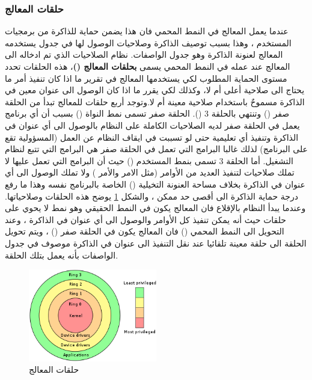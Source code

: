 \documentclass[document.tex]{subfiles}
\begin{document}
\subsubsection{حلقات المعالج }
عندما يعمل المعالج في النمط المحمي فان هذا يضمن حماية للذاكرة من برمجيات المستخدم ، وهذا بسبب توصيف الذاكرة وصلاحيات الوصول لها في جدول يستخدمه المعالج لعنونة الذاكرة وهو جدول الواصفات. نظام الصلاحيات الذي تم ادخاله الى المعالج عند عمله في النمط المحمي يسمى \textbf{بحلقات المعالج ()}، هذه الحلقات تحدد مستوى الحماية المطلوب لكي يستخدمها المعالج في تقرير ما اذا كان تنفيذ أمر ما يحتاج الى صلاحية أعلى أم لا، وكذلك لكي يقرر ما اذا كان الوصول الى عنوان معين في الذاكرة مسموحٌ باستخدام صلاحية معينة أم لا.وتوجد أربع حلقات للمعالج تبدأ من الحلقة صفر () وتنتهي بالحلقة 3 (). الحلقة صفر تسمى نمط النواة () بسبب أن أي برنامج يعمل في الحلقة صفر لديه الصلاحيات الكاملة على النظام بالوصول الى أي عنوان في الذاكرة وتنفيذ أي تعليمية حتى لو تسببت في ايقاف النظام عن العمل (المسؤولية تقع على البرنامج) لذلك غالبا البرامج التي تعمل في الحلقة صفر هي البرامج التي تتبع لنظام التشغيل. أما الحلقة 3 تسمى بنمط المستخدم () حيث أن البرامج التي تعمل عليها لا تملك صلاحيات لتنفيذ العديد من الأوامر (مثل الامر  والأمر ) ولا تملك الوصول الى أي عنوان في الذاكرة بخلاف مساحة العنونة التخيلية () الخاصة بالبرنامج نفسه وهذا ما رفع درجة حماية الذاكرة الى أقصى حد ممكن ، والشكل \ref{fig:rings} يوضح هذه الحلقات وصلاحياتها. وعندما يبدأ النظام بالإقلاع فان المعالج يكون في النمط الحقيقي وهو نمط لا يحوي على حلقات حيث أنه يمكن تنفيذ كل الأوامر والوصول الى أي عنوان في الذاكرة ، وعند التحويل الى النمط المحمي () فان المعالج يكون في الحلقة صفر () ، ويتم تحويل الحلقة الى حلقة معينة تلقائيا عند نقل التنفيذ الى عنوان في الذاكرة موصوف في جدول الواصفات بأنه يعمل بتلك الحلقة.

\begin{figure}[h!]
  \label{fig:rings} 
  \caption{حلقات المعالج}
  \centering
   \includegraphics[width=0.5\textwidth]{../img/rings}
\end{figure}
\end{document}
